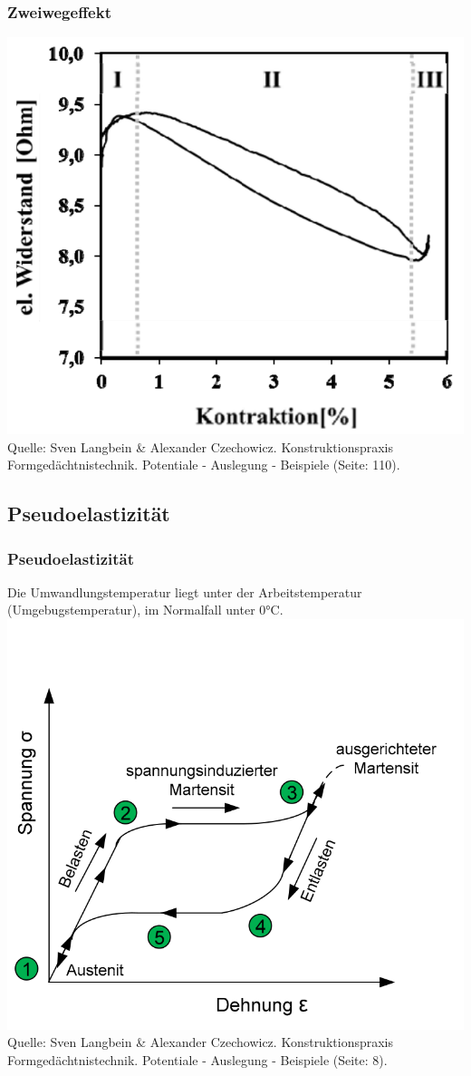\begin{frame}[c]\frametitle{Zweiwegeffekt}
	\centering
	\includegraphics[height=0.5\textwidth]{medien/widerstand_zu_kontraktion.png}
	\\
	\tiny{Quelle: Sven Langbein \& Alexander Czechowicz. Konstruktionspraxis
	Formgedächtnistechnik. Potentiale - Auslegung - Beispiele (Seite: 110).}
\end{frame}

\subsection{Pseudoelastizität}
\label{fgl:pseudoelastizität}
\begin{frame}[c]\frametitle{Pseudoelastizität}
	Die Umwandlungstemperatur liegt unter der Arbeitstemperatur
	(Umgebugstemperatur), im Normalfall unter 0°C.\\
	\centering
	\includegraphics[height=0.5\textwidth]{medien/Verhalten_beim_pseudoelastischen_Effekt.png}
	\\
	\tiny{Quelle: Sven Langbein \& Alexander Czechowicz. Konstruktionspraxis
	Formgedächtnistechnik. Potentiale - Auslegung - Beispiele (Seite: 8).}
\end{frame}
